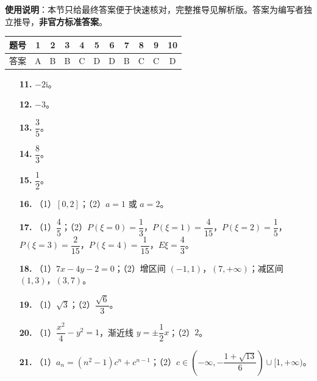 
\begin{gknotice}
\textbf{使用说明}：本节只给最终答案便于快速核对，完整推导见解析版。答案为编写者独立推导，\textbf{非官方标准答案}。
\end{gknotice}

\begin{center}\begin{tabular}{ccccccccccc}
\toprule
题号 & 1 & 2 & 3 & 4 & 5 & 6 & 7 & 8 & 9 & 10 \\
\midrule
答案 & A & B & B & C & D & D & B & C & C & D \\
\bottomrule
\end{tabular}\end{center}

\begin{itemize}[leftmargin=2.6em]
  \item[\textbf{11.}] $-2\mathrm{i}$。
  \item[\textbf{12.}] $-3$。
  \item[\textbf{13.}] $\dfrac35$。
  \item[\textbf{14.}] $\dfrac83$。
  \item[\textbf{15.}] $\dfrac12$。
\end{itemize}

\begin{itemize}[leftmargin=2.6em]
  \item[\textbf{16.}] （1）$[0,2]$；（2）$a=1$ 或 $a=2$。
  \item[\textbf{17.}] （1）$\dfrac45$；（2）$P(\xi=0)=\dfrac13$，$P(\xi=1)=\dfrac{4}{15}$，$P(\xi=2)=\dfrac15$，$P(\xi=3)=\dfrac{2}{15}$，$P(\xi=4)=\dfrac1{15}$，$E\xi=\dfrac43$。
  \item[\textbf{18.}] （1）$7x-4y-2=0$；（2）增区间 $(-1,1)$，$(7,+\infty)$；减区间 $(1,3)$，$(3,7)$。
  \item[\textbf{19.}] （1）$\sqrt3$；（2）$\dfrac{\sqrt6}{3}$。
  \item[\textbf{20.}] （1）$\dfrac{x^2}{4}-y^2=1$，渐近线 $y=\pm\dfrac12x$；（2）$2$。
  \item[\textbf{21.}] （1）$a_n=(n^2-1)c^n+c^{n-1}$；（2）$c\in\left(-\infty,-\dfrac{1+\sqrt{13}}{6}\right)\cup[1,+\infty)$。
\end{itemize}

